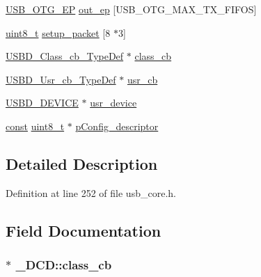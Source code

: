 \begin{DoxyCompactItemize}
\item 
\hyperlink{group___u_s_b___c_o_r_e___exported___types_gad1c65925021e8dac88858e10bb2a7eea}{U\-S\-B\-\_\-\-O\-T\-G\-\_\-\-E\-P} \hyperlink{struct___d_c_d_ac3ccf3f4349515a84f147bb2f33cf5d8}{out\-\_\-ep} \mbox{[}U\-S\-B\-\_\-\-O\-T\-G\-\_\-\-M\-A\-X\-\_\-\-T\-X\-\_\-\-F\-I\-F\-O\-S\mbox{]}
\item 
\hyperlink{stdint_8h_aba7bc1797add20fe3efdf37ced1182c5}{uint8\-\_\-t} \hyperlink{struct___d_c_d_a2615c2d71fc118bdefb6c0977868e584}{setup\-\_\-packet} \mbox{[}8 $\ast$3\mbox{]}
\item 
\hyperlink{group___u_s_b___c_o_r_e___exported___types_ga94642fd764d31c3fb97bb089dc94d539}{U\-S\-B\-D\-\_\-\-Class\-\_\-cb\-\_\-\-Type\-Def} $\ast$ \hyperlink{struct___d_c_d_affeffd10cafcdb7fadade2d3a8634773}{class\-\_\-cb}
\item 
\hyperlink{group___u_s_b___c_o_r_e___exported___types_ga333d185c45dd40a75aac486dd49b7160}{U\-S\-B\-D\-\_\-\-Usr\-\_\-cb\-\_\-\-Type\-Def} $\ast$ \hyperlink{struct___d_c_d_affc1e2e5b5120420657b34dffdbb0b1f}{usr\-\_\-cb}
\item 
\hyperlink{group___u_s_b___c_o_r_e___exported___types_ga383d3d5bf4017c2d95af4e092892d946}{U\-S\-B\-D\-\_\-\-D\-E\-V\-I\-C\-E} $\ast$ \hyperlink{struct___d_c_d_a2a04030a710ea9b67d6392a155502e82}{usr\-\_\-device}
\item 
\hyperlink{group___n_a_m_e_ga7ae6d0e43244213b34de2c2b9aa30da6}{const} \hyperlink{stdint_8h_aba7bc1797add20fe3efdf37ced1182c5}{uint8\-\_\-t} $\ast$ \hyperlink{struct___d_c_d_ad31ad0fdc64abffd21b7fc7ffbf06a3f}{p\-Config\-\_\-descriptor}
\end{DoxyCompactItemize}


\subsection{Detailed Description}


Definition at line 252 of file usb\-\_\-core.\-h.



\subsection{Field Documentation}
\hypertarget{struct___d_c_d_affeffd10cafcdb7fadade2d3a8634773}{
\subsubsection[{class\-\_\-cb}]{$\ast$ \-\_\-\-D\-C\-D\-::class\-\_\-cb}}\label{struct___d_c_d_affeffd10cafcdb7fadade2d3a8634773}


